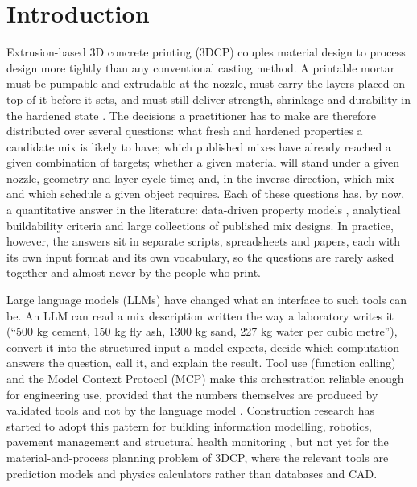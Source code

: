 \documentclass[preprint,12pt]{elsarticle}
\begin{document}
\linenumbers

\section{Introduction}

Extrusion-based 3D concrete printing (3DCP) couples material design to process design more tightly than any conventional casting method. A printable mortar must be pumpable and extrudable at the nozzle, must carry the layers placed on top of it before it sets, and must still deliver strength, shrinkage and durability in the hardened state \cite{buswell2018roadmap,roussel2018rheological}. The decisions a practitioner has to make are therefore distributed over several questions: what fresh and hardened properties a candidate mix is likely to have; which published mixes have already reached a given combination of targets; whether a given material will stand under a given nozzle, geometry and layer cycle time; and, in the inverse direction, which mix and which schedule a given object requires. Each of these questions has, by now, a quantitative answer in the literature: data-driven property models \cite{malik2024mixdesign3dcp,zafar2025ensemblerheology,ali2023mltensile3dcp,monkman2026datadrivenreview}, analytical buildability criteria \cite{roussel2018rheological,perrot2016structural,suiker2018mechanical,wolfs2018early,kruger2019lowerbound} and large collections of published mix designs. In practice, however, the answers sit in separate scripts, spreadsheets and papers, each with its own input format and its own vocabulary, so the questions are rarely asked together and almost never by the people who print.

Large language models (LLMs) have changed what an interface to such tools can be. An LLM can read a mix description written the way a laboratory writes it (``500 kg cement, 150 kg fly ash, 1300 kg sand, 227 kg water per cubic metre''), convert it into the structured input a model expects, decide which computation answers the question, call it, and explain the result. Tool use (function calling) and the Model Context Protocol (MCP) \cite{schick2023toolformer,yao2023react,anthropic2024mcp,hou2025mcp} make this orchestration reliable enough for engineering use, provided that the numbers themselves are produced by validated tools and not by the language model \cite{bran2024chemcrow}. Construction research has started to adopt this pattern for building information modelling, robotics, pavement management and structural health monitoring \cite{du2026text2bim,dong2025aibim,chen2025multiagentrc,zeng2026pavementagents,liu2026llm4shm,avila2025hai}, but not yet for the material-and-process planning problem of 3DCP, where the relevant tools are prediction models and physics calculators rather than databases and CAD.
\end{document}
